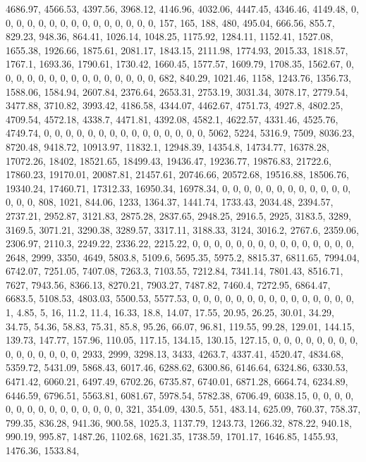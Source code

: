\documentclass[
]{article}
\begin{document}
4686.97, 4566.53, 4397.56, 3968.12, 4146.96, 4032.06, 4447.45, 4346.46,
4149.48, 0, 0, 0, 0, 0, 0, 0, 0, 0, 0, 0, 0, 0, 0, 0, 157, 165, 188,
480, 495.04, 666.56, 855.7, 829.23, 948.36, 864.41, 1026.14, 1048.25,
1175.92, 1284.11, 1152.41, 1527.08, 1655.38, 1926.66, 1875.61, 2081.17,
1843.15, 2111.98, 1774.93, 2015.33, 1818.57, 1767.1, 1693.36, 1790.61,
1730.42, 1660.45, 1577.57, 1609.79, 1708.35, 1562.67, 0, 0, 0, 0, 0, 0,
0, 0, 0, 0, 0, 0, 0, 0, 0, 682, 840.29, 1021.46, 1158, 1243.76, 1356.73,
1588.06, 1584.94, 2607.84, 2376.64, 2653.31, 2753.19, 3031.34, 3078.17,
2779.54, 3477.88, 3710.82, 3993.42, 4186.58, 4344.07, 4462.67, 4751.73,
4927.8, 4802.25, 4709.54, 4572.18, 4338.7, 4471.81, 4392.08, 4582.1,
4622.57, 4331.46, 4525.76, 4749.74, 0, 0, 0, 0, 0, 0, 0, 0, 0, 0, 0, 0,
0, 0, 0, 5062, 5224, 5316.9, 7509, 8036.23, 8720.48, 9418.72, 10913.97,
11832.1, 12948.39, 14354.8, 14734.77, 16378.28, 17072.26, 18402,
18521.65, 18499.43, 19436.47, 19236.77, 19876.83, 21722.6, 17860.23,
19170.01, 20087.81, 21457.61, 20746.66, 20572.68, 19516.88, 18506.76,
19340.24, 17460.71, 17312.33, 16950.34, 16978.34, 0, 0, 0, 0, 0, 0, 0,
0, 0, 0, 0, 0, 0, 0, 0, 808, 1021, 844.06, 1233, 1364.37, 1441.74,
1733.43, 2034.48, 2394.57, 2737.21, 2952.87, 3121.83, 2875.28, 2837.65,
2948.25, 2916.5, 2925, 3183.5, 3289, 3169.5, 3071.21, 3290.38, 3289.57,
3317.11, 3188.33, 3124, 3016.2, 2767.6, 2359.06, 2306.97, 2110.3,
2249.22, 2336.22, 2215.22, 0, 0, 0, 0, 0, 0, 0, 0, 0, 0, 0, 0, 0, 0, 0,
2648, 2999, 3350, 4649, 5803.8, 5109.6, 5695.35, 5975.2, 8815.37,
6811.65, 7994.04, 6742.07, 7251.05, 7407.08, 7263.3, 7103.55, 7212.84,
7341.14, 7801.43, 8516.71, 7627, 7943.56, 8366.13, 8270.21, 7903.27,
7487.82, 7460.4, 7272.95, 6864.47, 6683.5, 5108.53, 4803.03, 5500.53,
5577.53, 0, 0, 0, 0, 0, 0, 0, 0, 0, 0, 0, 0, 0, 0, 0, 1, 4.85, 5, 16,
11.2, 11.4, 16.33, 18.8, 14.07, 17.55, 20.95, 26.25, 30.01, 34.29,
34.75, 54.36, 58.83, 75.31, 85.8, 95.26, 66.07, 96.81, 119.55, 99.28,
129.01, 144.15, 139.73, 147.77, 157.96, 110.05, 117.15, 134.15, 130.15,
127.15, 0, 0, 0, 0, 0, 0, 0, 0, 0, 0, 0, 0, 0, 0, 0, 2933, 2999,
3298.13, 3433, 4263.7, 4337.41, 4520.47, 4834.68, 5359.72, 5431.09,
5868.43, 6017.46, 6288.62, 6300.86, 6146.64, 6324.86, 6330.53, 6471.42,
6060.21, 6497.49, 6702.26, 6735.87, 6740.01, 6871.28, 6664.74, 6234.89,
6446.59, 6796.51, 5563.81, 6081.67, 5978.54, 5782.38, 6706.49, 6038.15,
0, 0, 0, 0, 0, 0, 0, 0, 0, 0, 0, 0, 0, 0, 0, 321, 354.09, 430.5, 551,
483.14, 625.09, 760.37, 758.37, 799.35, 836.28, 941.36, 900.58, 1025.3,
1137.79, 1243.73, 1266.32, 878.22, 940.18, 990.19, 995.87, 1487.26,
1102.68, 1621.35, 1738.59, 1701.17, 1646.85, 1455.93, 1476.36, 1533.84,
\end{document}
